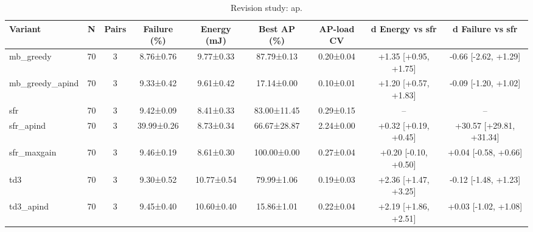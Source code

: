 \begin{table}[t]
\centering
\caption{Revision study: ap.}
\label{tab:rev_ap}
\footnotesize
\setlength{\tabcolsep}{3pt}
\begin{tabular}{lcccccccc}
\hline
Variant & N & Pairs & Failure (\%) & Energy (mJ) & Best AP (\%) & AP-load CV & d Energy vs sfr & d Failure vs sfr \\
\hline
mb\_greedy & 70 & 3 & 8.76±0.76 & 9.77±0.33 & 87.79±0.13 & 0.20±0.04 & +1.35 [+0.95, +1.75] & -0.66 [-2.62, +1.29] \\
mb\_greedy\_apind & 70 & 3 & 9.33±0.42 & 9.61±0.42 & 17.14±0.00 & 0.10±0.01 & +1.20 [+0.57, +1.83] & -0.09 [-1.20, +1.02] \\
sfr & 70 & 3 & 9.42±0.09 & 8.41±0.33 & 83.00±11.45 & 0.29±0.15 & -- & -- \\
sfr\_apind & 70 & 3 & 39.99±0.26 & 8.73±0.34 & 66.67±28.87 & 2.24±0.00 & +0.32 [+0.19, +0.45] & +30.57 [+29.81, +31.34] \\
sfr\_maxgain & 70 & 3 & 9.46±0.19 & 8.61±0.30 & 100.00±0.00 & 0.27±0.04 & +0.20 [-0.10, +0.50] & +0.04 [-0.58, +0.66] \\
td3 & 70 & 3 & 9.30±0.52 & 10.77±0.54 & 79.99±1.06 & 0.19±0.03 & +2.36 [+1.47, +3.25] & -0.12 [-1.48, +1.23] \\
td3\_apind & 70 & 3 & 9.45±0.40 & 10.60±0.40 & 15.86±1.01 & 0.22±0.04 & +2.19 [+1.86, +2.51] & +0.03 [-1.02, +1.08] \\
\hline
\end{tabular}
\end{table}
